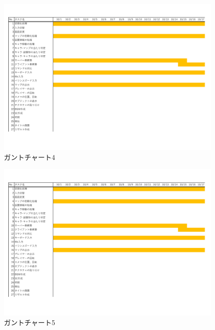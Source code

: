 \documentclass{jarticle}
\begin{document}
\begin{figure}[H]
    \centering
    \label{table:gunt1}
    \caption{ガントチャート4}
    \includegraphics[scale=0.5, page=4]{gunt.pdf}
\end{figure}
\begin{figure}[H]
    \centering
    \label{table:gunt1}
    \caption{ガントチャート5}
    \includegraphics[scale=0.5, page=5]{gunt.pdf}
\end{figure}
\end{document}
